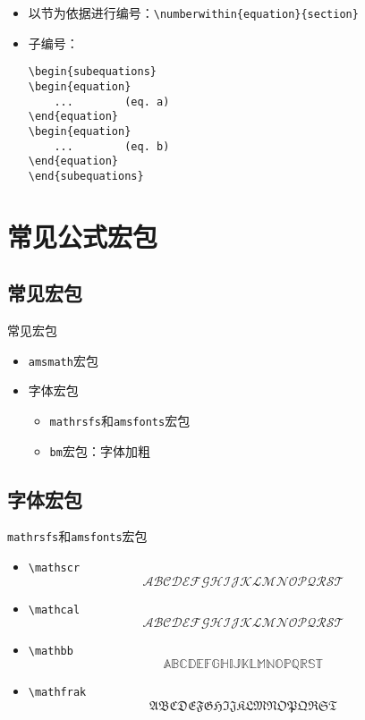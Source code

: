 \documentclass[t]{beamer}
\begin{document}
\begin{frame}[fragile]
\begin{itemize}
\item 以节为依据进行编号：\verb"\numberwithin{equation}{section}"
\item 子编号：
\begin{verbatim}
\begin{subequations}
\begin{equation}
    ...        (eq. a)
\end{equation}
\begin{equation}
    ...        (eq. b)
\end{equation}
\end{subequations}
\end{verbatim}


\end{itemize}

\end{frame}




\section{常见公式宏包}

\subsection{常见宏包}
\begin{frame}{常见宏包}
\begin{itemize}
\item \texttt{amsmath}宏包
\item 字体宏包
\begin{itemize}\large
\item \texttt{mathrsfs}和\texttt{amsfonts}宏包
\item \texttt{bm}宏包：字体加粗
\end{itemize}
\end{itemize}


\end{frame}

\subsection{字体宏包}
\begin{frame}[fragile]{\texttt{mathrsfs}和\texttt{amsfonts}宏包}
\begin{itemize}
\item \verb"\mathscr" $$\mathscr{ABCDEFGHIJKLMNOPQRST}$$
\item \verb"\mathcal"$$\mathcal{ABCDEFGHIJKLMNOPQRST}$$
\item \verb"\mathbb"$$\mathbb{ABCDEFGHIJKLMNOPQRST}$$
\item \verb"\mathfrak"$$\mathfrak{ABCDEFGHIJKLMNOPQRST}$$
\end{itemize}
\end{frame}
\end{document}
